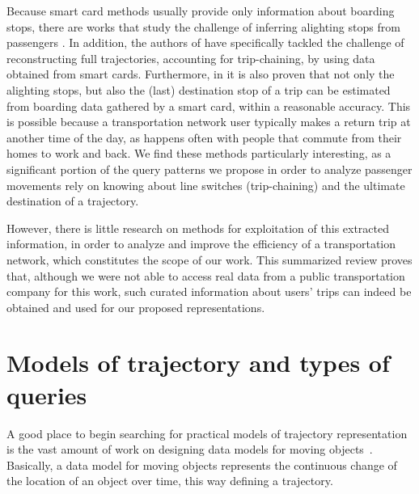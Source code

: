 \documentclass[a4paper,10pt,twoside]{book}
\begin{document}
    Because smart card methods usually provide only information about boarding stops, there are works that study the challenge of inferring alighting stops from passengers \cite{wang2011review}. In addition, the authors of \cite{tao2014exploring} have specifically tackled the challenge of reconstructing full trajectories, accounting for trip-chaining, by using data obtained from smart cards. Furthermore, in \cite{alsger2016validating} it is also proven that not only the alighting stops, but also the (last) destination stop of a trip can be estimated from boarding data gathered by a smart card, within a reasonable accuracy. This is possible because a transportation network user typically makes a return trip at another time of the day, as happens often with people that commute from their homes to work and back. We find these methods particularly interesting, as a significant portion of the query patterns we propose in order to analyze passenger movements rely on knowing about line switches (trip-chaining) and the ultimate destination of a trajectory.
    
    However, there is little research on methods for exploitation of this extracted information, in order to analyze and improve the efficiency of a transportation network, which constitutes the scope of our work. This summarized review proves that, although we were not able to access real data from a public transportation company for this work, such curated information about users' trips can indeed be obtained and used for our proposed representations.
	
	\section{Models of trajectory and types of queries}
    A good place to begin searching for practical models of trajectory representation is the vast amount of work on designing data models for moving objects~\cite{DBLP:conf/ssdbm/WolfsonXCJ98,DBLP:conf/icde/SistlaWCD97,DBLP:journals/tods/GutingBEJLSV00,DBLP:conf/chorochronos/GutingBEJLNSV03,DBLP:journals/geoinformatica/Spaccapietra01,DBLP:conf/sigmod/ForlizziGNS00,DBLP:journals/geoinformatica/ErwigGSV99,DBLP:books/mk/GutingS2005}. Basically, a data model for moving objects represents the continuous change of the location of an object over time, this way defining a trajectory.
    
\end{document}
